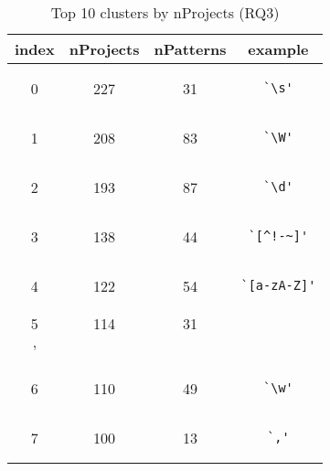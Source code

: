 
\begin{table}
\begin{center}
\caption{Top 10 clusters by nProjects (RQ3)}
\label{table:topNClusters}

\begin{tabular}
{cccc}
\toprule
index & nProjects & nPatterns & example\\
\midrule
0 & 227 & 31 & \begin{minipage}{0.5in}\begin{verbatim}`\s'\end{verbatim}\end{minipage}\\
\midrule
1 & 208 & 83 & \begin{minipage}{0.5in}\begin{verbatim}`\W'\end{verbatim}\end{minipage}\\
\midrule
2 & 193 & 87 & \begin{minipage}{0.5in}\begin{verbatim}`\d'\end{verbatim}\end{minipage}\\
\midrule
3 & 138 & 44 & \begin{minipage}{0.5in}\begin{verbatim}`[^!-~]'\end{verbatim}\end{minipage}\\
\midrule
4 & 122 & 54 & \begin{minipage}{0.5in}\begin{verbatim}`[a-zA-Z]'\end{verbatim}\end{minipage}\\
\midrule
5 & 114 & 31 & \begin{minipage}{0.5in}\begin{verbatim}`\\'\end{verbatim}\end{minipage}\\
\midrule
6 & 110 & 49 & \begin{minipage}{0.5in}\begin{verbatim}`\w'\end{verbatim}\end{minipage}\\
\midrule
7 & 100 & 13 & \begin{minipage}{0.5in}\begin{verbatim}`,'\end{verbatim}\end{minipage}\\

\end{tabular}
\end{center}
\end{table}
